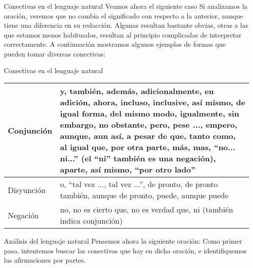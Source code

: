 
\begin{frame}{Conectivas en el lenguaje natural}
  Veamos ahora el siguiente caso
  \jump
  \jump
  Si analizamos la oración, veremos que no cambia el significado con respecto a
  la anterior, aunque tiene una diferencia en su redacción.
  \jump
  \jump
  Algunas resultan bastante obvias, otras a las que estamos menos habituados,
  resultan al principio complicadas de interpretar correctamente.
  \jump
  A continuación mostramos algunos ejemplos de formas que pueden tomar diversas
  conectivas:
\end{frame}


\begin{frame}{Conectivas en el lenguaje natural}
  \begin{tabular}{| l | p{8cm} |}
    \hline
    Conjunción & y, también, además, adicionalmente, en adición, ahora,
                incluso, inclusive, así mismo, de igual forma, del mismo modo,
                igualmente, sin embargo, no obstante, pero, pese ..., empero,
                aunque, aun así, a pesar de que, tanto como, al igual que,
                por otra parte, más, mas, ``no... ni...'' (el ``ni'' también es una negación),
                aparte, así mismo, ``por otro lado'' \\
    \hline
    Disyunción &  o, ``tal vez ..., tal vez ...'', de pronto, de pronto también,
                  aunque de pronto, puede, aunque puede \\
    \hline
    Negación & no, no es cierto que, no es verdad que, ni (también indica conjunción) \\
    \hline
  \end{tabular}
\end{frame}


\begin{frame}{Análisis del lenguaje natural}
  Pensemos ahora la siguiente oración:
  \jump
  \jump
  Como primer paso, intentemos buscar las conectivas que hay en dicha oración,
  e identifiquemos las afirmaciones por partes.
\end{frame}

